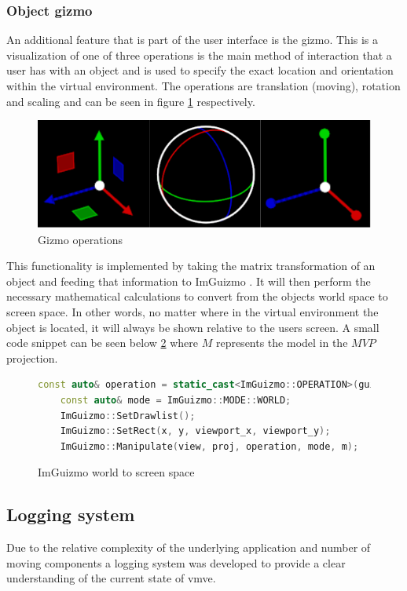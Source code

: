 \documentclass[11pt]{article}
\begin{document}
\subsubsection{Object gizmo}
An additional feature that is part of the user interface is the gizmo. This is a
visualization of one of three operations is the main method of interaction that
a user has with an object and is used to specify the exact location and
orientation within the virtual environment. The operations are translation
(moving), rotation and scaling and can be seen in figure \ref{fig:gizmo}
respectively.
\begin{figure}[H]
  \centering
  \includegraphics[width=\textwidth]{images/gizmo.png}
  \caption{Gizmo operations}
  \label{fig:gizmo}
\end{figure}

This functionality is implemented by taking the matrix transformation of an
object and feeding that information to ImGuizmo \cite{imguizmo}. It will then
perform the necessary mathematical calculations to convert from the objects
world space to screen space. In other words, no matter where in the virtual
environment the object is located, it will always be shown relative to the users
screen. A small code snippet can be seen below \ref{fig:imguizmo_code} where
\(M\) represents the model in the \(MVP\) projection.


\begin{figure}[ht]
  \centering
  \begin{lstlisting}[language=C++]
    const auto& operation = static_cast<ImGuizmo::OPERATION>(guizmo_operation);
    const auto& mode = ImGuizmo::MODE::WORLD;
    ImGuizmo::SetDrawlist();
    ImGuizmo::SetRect(x, y, viewport_x, viewport_y);
    ImGuizmo::Manipulate(view, proj, operation, mode, m);
  \end{lstlisting}
  \caption{ImGuizmo world to screen space}
  \label{fig:imguizmo_code}
\end{figure}

\subsection{Logging system}
Due to the relative complexity of the underlying application and number of
moving components a logging system was developed to provide a clear
understanding of the current state of \gls*{vmve}. 
\end{document}
